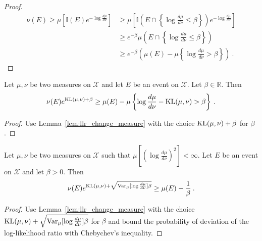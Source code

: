 \begin{proof}\leanok
\begin{align*}
\nu(E)
\ge \mu\left[\mathbb{I}(E) e^{- \log\frac{d \mu}{d \nu} }\right]
&\ge \mu\left[\mathbb{I}\left(E \cap \left\{\log\frac{d \mu}{d \nu} \le \beta\right\}\right) e^{- \log\frac{d \mu}{d \nu} }\right]
\\
&\ge e^{- \beta}\mu\left(E \cap \left\{\log\frac{d \mu}{d \nu} \le \beta\right\}\right)
\\
&\ge e^{- \beta}\left( \mu(E) - \mu\left\{ \log\frac{d \mu}{d \nu} > \beta \right\} \right)
\: .
\end{align*}
\end{proof}

\begin{corollary}
  \label{cor:kl_change_measure}
  Let $\mu, \nu$ be two measures on $\mathcal X$ and let $E$ be an event on $\mathcal X$. Let $\beta \in \mathbb{R}$. Then
  \begin{align*}
  \nu(E) e^{\operatorname{KL}(\mu, \nu) + \beta} \ge \mu(E) - \mu\left\{ \log\frac{d \mu}{d \nu} - \operatorname{KL}(\mu, \nu) > \beta \right\} \: .
  \end{align*}
\end{corollary}

\begin{proof}
Use Lemma~\ref{lem:llr_change_measure} with the choice $\operatorname{KL}(\mu, \nu) + \beta$ for $\beta$.
\end{proof}

\begin{lemma}
  \label{lem:llr_change_measure_variance}
  \uses{}
  Let $\mu, \nu$ be two measures on $\mathcal X$ such that $\mu\left[\left(\log\frac{d \mu}{d \nu}\right)^2\right] < \infty$. Let $E$ be an event on $\mathcal X$ and let $\beta > 0$. Then
  \begin{align*}
  \nu(E) e^{\operatorname{KL}(\mu, \nu) + \sqrt{\operatorname{Var}_\mu[\log\frac{d \mu}{d \nu}]\beta}} \ge \mu(E) - \frac{1}{\beta} \: .
  \end{align*}
\end{lemma}

\begin{proof}%
{}
Use Lemma~\ref{lem:llr_change_measure} with the choice $\operatorname{KL}(\mu, \nu) + \sqrt{\operatorname{Var}_\mu[\log\frac{d \mu}{d \nu}]\beta}$ for $\beta$ and bound the probability of deviation of the log-likelihood ratio with Chebychev's inequality.
\end{proof}

